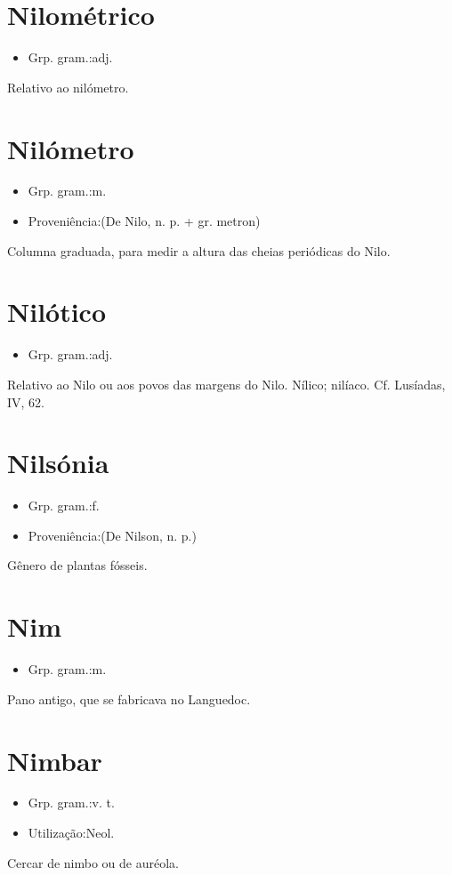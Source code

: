 \section{Nilométrico}
\begin{itemize}
\item {Grp. gram.:adj.}
\end{itemize}
Relativo ao nilómetro.
\section{Nilómetro}
\begin{itemize}
\item {Grp. gram.:m.}
\end{itemize}
\begin{itemize}
\item {Proveniência:(De \textunderscore Nilo\textunderscore , n. p. + gr. \textunderscore metron\textunderscore )}
\end{itemize}
Columna graduada, para medir a altura das cheias periódicas do Nilo.
\section{Nilótico}
\begin{itemize}
\item {Grp. gram.:adj.}
\end{itemize}
Relativo ao Nilo ou aos povos das margens do Nilo.
Nílico; nilíaco. Cf. \textunderscore Lusíadas\textunderscore , IV, 62.
\section{Nilsónia}
\begin{itemize}
\item {Grp. gram.:f.}
\end{itemize}
\begin{itemize}
\item {Proveniência:(De \textunderscore Nilson\textunderscore , n. p.)}
\end{itemize}
Gênero de plantas fósseis.
\section{Nim}
\begin{itemize}
\item {Grp. gram.:m.}
\end{itemize}
Pano antigo, que se fabricava no Languedoc.
\section{Nimbar}
\begin{itemize}
\item {Grp. gram.:v. t.}
\end{itemize}
\begin{itemize}
\item {Utilização:Neol.}
\end{itemize}
Cercar de nimbo ou de auréola.
